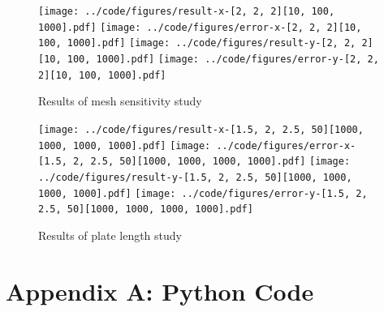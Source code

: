 \documentclass[twocolumn,10pt]{asme2ej}
\begin{document}
\begin{figure}[tb]
\begin{center}
\texttt{[image: ../code/figures/result-x-[2, 2, 2][10, 100, 1000].pdf]}
\texttt{[image: ../code/figures/error-x-[2, 2, 2][10, 100, 1000].pdf]}
\texttt{[image: ../code/figures/result-y-[2, 2, 2][10, 100, 1000].pdf]}
\texttt{[image: ../code/figures/error-y-[2, 2, 2][10, 100, 1000].pdf]}
\caption{Results of mesh sensitivity study}
\label{sensitivity_study}
\end{center}
\end{figure}

\begin{figure}[thb]
\begin{center}
\texttt{[image: ../code/figures/result-x-[1.5, 2, 2.5, 50][1000, 1000, 1000, 1000].pdf]}
\texttt{[image: ../code/figures/error-x-[1.5, 2, 2.5, 50][1000, 1000, 1000, 1000].pdf]}
\texttt{[image: ../code/figures/result-y-[1.5, 2, 2.5, 50][1000, 1000, 1000, 1000].pdf]}
\texttt{[image: ../code/figures/error-y-[1.5, 2, 2.5, 50][1000, 1000, 1000, 1000].pdf]}
\caption{Results of plate length study}
\label{length_study}
\end{center}
\end{figure}

\clearpage
\onecolumn
\appendix       %
\section*{Appendix A: Python Code}



\end{document}
